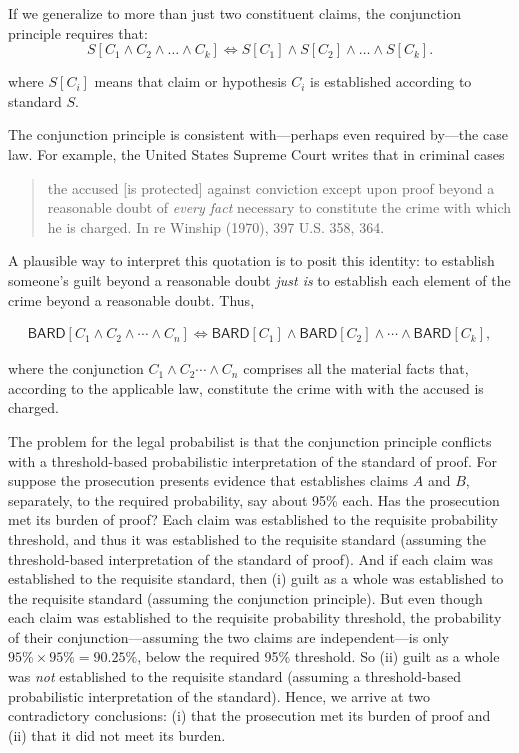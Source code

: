 \documentclass[10pt,dvipsnames,enabledeprecatedfontcommands]{scrartcl}
\newcommand{\et}{\wedge}
\begin{document}
\noindent If we generalize to more than just two constituent claims, the
conjunction principle requires that:
\[S[C_1 \wedge C_2  \wedge \dots \wedge  C_k] \Leftrightarrow S[C_1] \wedge S[C_2]  \wedge \dots \wedge  S[C_k].\]

\noindent where \(S[C_i]\) means that claim or hypothesis \(C_i\) is
established according to standard \(S\).

The conjunction principle is consistent with---perhaps even required
by---the case law. For example, the United States Supreme Court writes
that in criminal cases

\begin{quote}
the accused [is protected] against conviction except upon proof beyond a reasonable doubt of \textit{every fact} necessary to constitute the crime with which he is charged. In re Winship (1970), 397 U.S. 358, 364. 
\end{quote}

\noindent A plausible way to interpret this quotation is to posit this
identity: to establish someone's guilt beyond a reasonable doubt
\textit{just is} to establish each element of the crime beyond a
reasonable doubt. Thus,

\begin{align*}\mathsf{BARD}[C_1 \wedge C_2   \wedge \cdots \wedge C_n] \Leftrightarrow \mathsf{BARD}[C_1] \wedge \mathsf{BARD}[C_2]  \wedge \cdots \wedge \mathsf{BARD}[C_k],
\end{align*}

\noindent where the conjunction \(C_1 \et C_2 \cdots \et C_n\) comprises
all the material facts that, according to the applicable law, constitute
the crime with with the accused is charged.

The problem for the legal probabilist is that the conjunction principle
conflicts with a threshold-based probabilistic interpretation of the
standard of proof. For suppose the prosecution presents evidence that
establishes claims \(A\) and \(B\), separately, to the required
probability, say about 95\% each. Has the prosecution met its burden of
proof? Each claim was established to the requisite probability
threshold, and thus it was established to the requisite standard
(assuming the threshold-based interpretation of the standard of proof).
And if each claim was established to the requisite standard, then (i)
guilt as a whole was established to the requisite standard (assuming the
conjunction principle). But even though each claim was established to
the requisite probability threshold, the probability of their
conjunction---assuming the two claims are independent---is only
\(95\%\times95\%=90.25\%\), below the required 95\% threshold. So (ii)
guilt as a whole was \textit{not} established to the requisite standard
(assuming a threshold-based probabilistic interpretation of the
standard). Hence, we arrive at two contradictory conclusions: (i) that
the prosecution met its burden of proof and (ii) that it did not meet
its burden.
\end{document}
